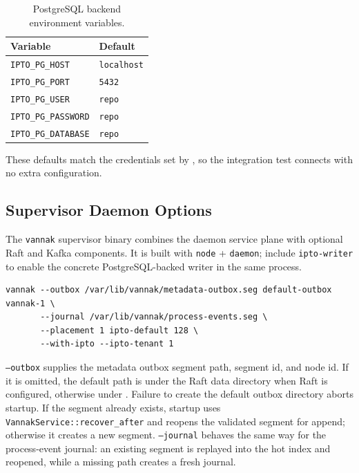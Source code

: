 \begin{table}[htbp]
\centering
\begin{tabular}{ll}
\hline
Variable & Default \\
\hline
\texttt{IPTO\_PG\_HOST} & \texttt{localhost} \\
\texttt{IPTO\_PG\_PORT} & \texttt{5432} \\
\texttt{IPTO\_PG\_USER} & \texttt{repo} \\
\texttt{IPTO\_PG\_PASSWORD} & \texttt{repo} \\
\texttt{IPTO\_PG\_DATABASE} & \texttt{repo} \\
\hline
\end{tabular}
\caption{\ipto{} PostgreSQL backend environment variables.}
\end{table}

These defaults match the credentials set by ,
so the integration test connects with no extra configuration.

\subsection{Supervisor Daemon Options}

The \texttt{vannak} supervisor binary combines the daemon service plane with
optional Raft and Kafka components. It is built with \texttt{node} +
\texttt{daemon}; include \texttt{ipto-writer} to enable the concrete
PostgreSQL-backed writer in the same process.

\begin{lstlisting}[numbers=none]
vannak --outbox /var/lib/vannak/metadata-outbox.seg default-outbox vannak-1 \
       --journal /var/lib/vannak/process-events.seg \
       --placement 1 ipto-default 128 \
       --with-ipto --ipto-tenant 1
\end{lstlisting}

\texttt{--outbox} supplies the metadata outbox segment path, segment id, and
node id. If it is omitted, the default path is under the Raft data directory
when Raft is configured, otherwise under
\filepath{\$HOME/.local/state/vannak}. Failure to create the default outbox
directory aborts startup. If the segment already exists, startup uses
\texttt{VannakService::recover\_after} and reopens the validated segment for
append; otherwise it creates a new segment. \texttt{--journal} behaves the same
way for the process-event journal: an existing segment is replayed into the hot
index and reopened, while a missing path creates a fresh journal.

